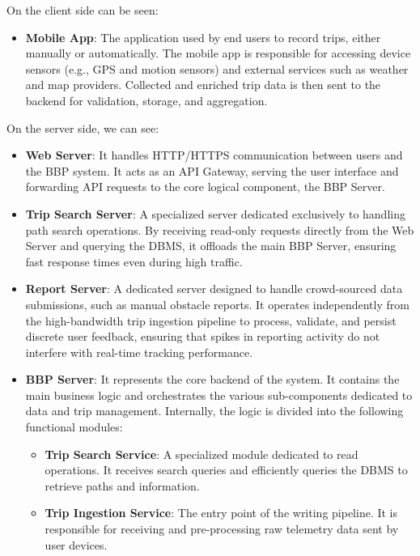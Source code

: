 \par On the client side can be seen:
\begin{itemize}
      \item \textbf{Mobile App}: The application used by end users to record trips, either manually or automatically.
            The mobile app is responsible for accessing device sensors (e.g., GPS and motion sensors) and external
            services such as weather and map providers. Collected and enriched trip data is then sent to the backend
            for validation, storage, and aggregation.
\end{itemize}
\par On the server side, we can see:
\begin{itemize}
    \item \textbf{Web Server}: It handles HTTP/HTTPS communication between users and the BBP system. It acts as an API Gateway, serving the user interface and forwarding API requests to the core logical component, the BBP Server.
    \item \textbf{Trip Search Server}: A specialized server dedicated exclusively to handling path search operations. By receiving read-only requests directly from the Web Server and querying the DBMS, it offloads the main BBP Server, ensuring fast response times even during high traffic.
    \item \textbf{Report Server}: A dedicated server designed to handle crowd-sourced data submissions, such as manual obstacle reports. It operates independently from the high-bandwidth trip ingestion pipeline to process, validate, and persist discrete user feedback, ensuring that spikes in reporting activity do not interfere with real-time tracking performance.
    \item \textbf{BBP Server}: It represents the core backend of the system. It contains the main business logic and orchestrates the various sub-components dedicated to data and trip management. Internally, the logic is divided into the following functional modules:
    \begin{itemize}
        \item \textbf{Trip Search Service}: A specialized module dedicated to read operations. It receives search queries and efficiently queries the DBMS to retrieve paths and information.
        
        \item \textbf{Trip Ingestion Service}: The entry point of the writing pipeline. It is responsible for receiving and pre-processing raw telemetry data sent by user devices.
        

\end{itemize}
\end{itemize}
